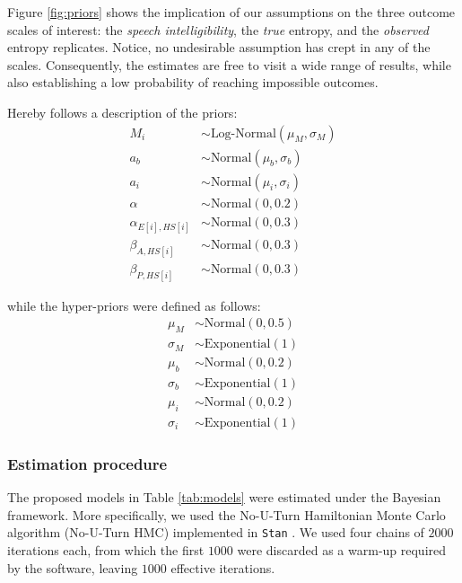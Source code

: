 Figure \ref{fig:priors} shows the implication of our assumptions on the three outcome scales of interest: the \textit{speech intelligibility}, the \textit{true} entropy, and the \textit{observed} entropy replicates. Notice, no undesirable assumption has crept in any of the scales. Consequently, the estimates are free to visit a wide range of results, while also establishing a low probability of reaching impossible outcomes.

Hereby follows a description of the priors:
%
\begin{align}
	M_{i} & \sim \text{Log-Normal}( \mu_{M}, \sigma_{M}) \\
	a_{b} & \sim \text{Normal}(\mu_{b}, \sigma_{b}) \\
	a_{i} & \sim \text{Normal}(\mu_{i}, \sigma_{i}) \\
	\alpha & \sim \text{Normal}(0, 0.2) \\
	\alpha_{E[i],HS[i]} & \sim \text{Normal}(0, 0.3) \\
	\beta_{A, HS[i]} & \sim \text{Normal}(0 , 0.3) \\
	\beta_{P, HS[i]} & \sim \text{Normal}(0, 0.3)
\end{align}

while the hyper-priors were defined as follows:
%
\begin{align}
	\mu_{M} & \sim \text{Normal}(0, 0.5) \\
	\sigma_{M} & \sim \text{Exponential}(1) \\
	\mu_{b} & \sim \text{Normal}(0, 0.2) \\
	\sigma_{b} & \sim \text{Exponential}(1) \\
	\mu_{i} & \sim \text{Normal}(0, 0.2) \\
	\sigma_{i} & \sim \text{Exponential}(1)
\end{align}
%
%
\subsubsection{Estimation procedure} \label{ssSA:model_estimation}
The proposed models in Table \ref{tab:models} were estimated under the Bayesian framework. More specifically, we used the No-U-Turn Hamiltonian Monte Carlo algorithm (No-U-Turn HMC) \citep{Betancourt_et_al_2013, Duane_et_al_1987, Hoffman_et_al_2014, Neal_2012} implemented in \texttt{Stan} \citep{Stan_2020}. We used four chains of $2000$ iterations each, from which the first $1000$ were discarded as a warm-up required by the software, leaving $1000$ effective iterations.

